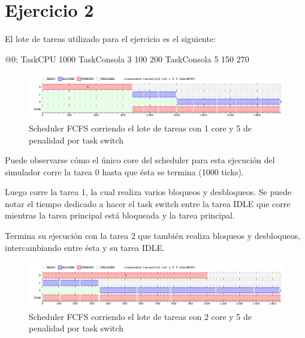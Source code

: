 \documentclass[a4paper,10pt,twoside]{article}
\newenvironment{pseudo}[1][]{%
    \vspace{0.5em}%
    \begin{algorithmic}%
}
{%
    \end{algorithmic}%
    \vspace{0.5em}%
}
\begin{document}
\newpage




\tableofcontents

\newpage



\section{Ejercicio 2}
El lote de tareas utilizado para el ejercicio es el siguiente:
\begin{pseudo}
	\State @0:
	\State TaskCPU 1000
	\State TaskConsola 3 100 200
	\State TaskConsola 5 150 270
\end{pseudo}

\begin{figure}[ht!]
\centering
\includegraphics[width=175mm]{../ejercicio2/FCFS1Core.png}
\caption{Scheduler FCFS corriendo el lote de tareas con 1 core y 5 de penalidad por task switch}
\label{FCFS1Core}
\end{figure}

Puede observarse cómo el único core del scheduler para esta ejecución del simulador corre la tarea 0 hasta que ésta se termina (1000 ticks).

Luego corre la tarea 1, la cual realiza varios bloqueos y desbloqueos. Se puede notar el tiempo dedicado a hacer el task switch entre la tarea IDLE que corre mientras la tarea principal está bloqueada y la tarea principal.

Termina su ejecución con la tarea 2 que también realiza bloqueos y desbloqueos, intercambiando entre ésta y su tarea IDLE.

\begin{figure}[ht!]
\centering
\includegraphics[width=175mm]{../ejercicio2/FCFS2Core.png}
\caption{Scheduler FCFS corriendo el lote de tareas con 2 core y 5 de penalidad por task switch}
\label{FCFS2Core}
\end{figure}
\end{document}

